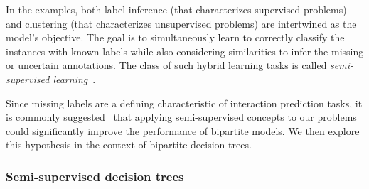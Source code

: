 In the examples, both label inference (that characterizes supervised problems) and clustering (that characterizes unsupervised problems) are intertwined as the model's objective. The goal is to simultaneously learn to correctly classify the instances with known labels while also considering similarities to infer the missing or uncertain annotations. The class of such hybrid learning tasks is called \emph{semi-supervised learning}~\cite{chapelle2006semisupervised,zhu2022introduction}.

Since missing labels are a defining characteristic of interaction prediction tasks, it is commonly suggested~\cite{he2017simboost,liu2016neighborhood,alves2023semisupervised}  %
that applying semi-supervised concepts to our problems could significantly improve the performance of bipartite models.
%
We then explore this hypothesis in the context of bipartite decision trees.



\subsubsection{Semi-supervised decision trees}
\label{sec:ss trees 2}

